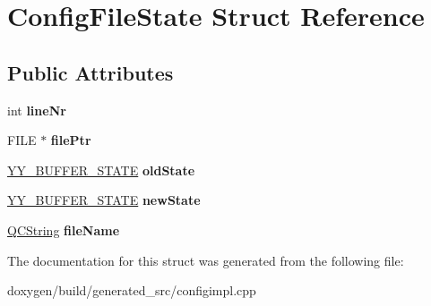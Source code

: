 \hypertarget{struct_config_file_state}{}\section{Config\+File\+State Struct Reference}
\label{struct_config_file_state}
\subsection*{Public Attributes}
\begin{DoxyCompactItemize}
\item 
\mbox{\label{struct_config_file_state_a41d216c2114d71fa486a48f063a88d16}} 
int {\bfseries line\+Nr}
\item 
\mbox{\label{struct_config_file_state_aa5d616a4c7712d0d7be52d4a56254672}} 
F\+I\+LE $\ast$ {\bfseries file\+Ptr}
\item 
\mbox{\label{struct_config_file_state_aaacb1254715397e72db10477de158e2c}} 
\mbox{\hyperlink{structyy__buffer__state}{Y\+Y\+\_\+\+B\+U\+F\+F\+E\+R\+\_\+\+S\+T\+A\+TE}} {\bfseries old\+State}
\item 
\mbox{\label{struct_config_file_state_a219e8266c897bd4c52c76e0adc04a900}} 
\mbox{\hyperlink{structyy__buffer__state}{Y\+Y\+\_\+\+B\+U\+F\+F\+E\+R\+\_\+\+S\+T\+A\+TE}} {\bfseries new\+State}
\item 
\mbox{\label{struct_config_file_state_a412089401b0967a7d7e0204cfadfef78}} 
\mbox{\hyperlink{class_q_c_string}{Q\+C\+String}} {\bfseries file\+Name}
\end{DoxyCompactItemize}


The documentation for this struct was generated from the following file\+:\begin{DoxyCompactItemize}
\item 
doxygen/build/generated\+\_\+src/configimpl.\+cpp\end{DoxyCompactItemize}
